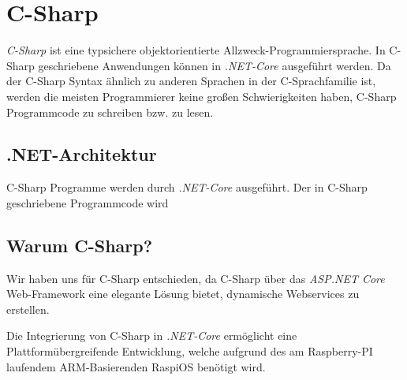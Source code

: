 \section{C-Sharp}
\label{C-Sharp}

\textit{C-Sharp} ist eine typsichere objektorientierte Allzweck-Programmiersprache.
In C-Sharp geschriebene Anwendungen können in \textit{.NET-Core} ausgeführt werden. 
Da der C-Sharp Syntax ähnlich zu anderen Sprachen in der C-Sprachfamilie ist, werden die meisten
Programmierer keine großen Schwierigkeiten haben, C-Sharp Programmcode zu schreiben bzw. zu lesen.  
\cite{csharpmicrosoft}

\subsection{.NET-Architektur}
C-Sharp Programme werden durch \textit{.NET-Core} ausgeführt. 
Der in C-Sharp geschriebene Programmcode wird 

\subsection{Warum C-Sharp?}
Wir haben uns für C-Sharp entschieden, da C-Sharp über das \textit{ASP.NET Core} Web-Framework eine elegante Lösung bietet, dynamische Webservices zu erstellen.

Die Integrierung von C-Sharp in \textit{.NET-Core} ermöglicht eine Plattformübergreifende Entwicklung, welche aufgrund des am Raspberry-PI laufendem ARM-Basierenden RaspiOS benötigt wird.
